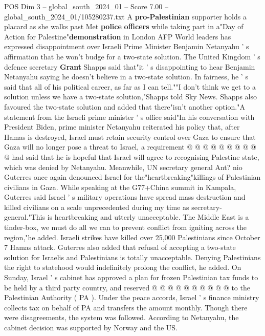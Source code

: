 \begin{textsample}{POS Dim 3 – global\_south\_2024\_01 – Score 7.00 – global\_south\_2024\_01/105280237.txt}  \label{ex:f3_pos_379}
A \textbf{pro-Palestinian} supporter holds a placard as she walks past Met \textbf{police} \textbf{officers} while taking part in a"Day of Action for Palestine"\textbf{demonstration} in London AFP World leaders has expressed disappointment over Israeli Prime Minister Benjamin Netanyahu ' s affirmation that he won't budge for a two-state solution.
The United Kingdom ' s defence secretary \textbf{Grant} Shapps said that"it ' s disappointing to hear Benjamin Netanyahu saying he doesn't believe in a two-state solution.
In fairness, he ' s said that all of his political career, as far as I can tell.""I don't think we get to a solution unless we have a two-state solution,"Shapps told Sky News.
Shapps also favoured the two-state solution and added that there"isn't another option."A statement from the Israeli prime minister ' s office said"In his conversation with President Biden, prime minister Netanyahu reiterated his policy that, after Hamas is destroyed, Israel must retain security control over Gaza to ensure that Gaza will no longer pose a threat to Israel, a requirement @ @ @ @ @ @ @ @ @ @ had said that he is hopeful that Israel will agree to recognising Palestine state, which was denied by Netanyahu.
Meanwhile, UN secretary general Ant? nio Guterres once again denounced Israel for the"heartbreaking"killings of Palestinian civilians in Gaza.
While speaking at the G77+China summit in Kampala, Guterres said Israel ' s military operations have spread mass destruction and killed civilians on a scale unprecedented during my time as secretary-general."This is heartbreaking and utterly unacceptable.
The Middle East is a tinder-box, we must do all we can to prevent conflict from igniting across the region,"he added.
Israeli strikes have killed over 25,000 Palestinians since October 7 Hamas attack.
Guterres also added that refusal of accepting a two-state solution for Israelis and Palestinians is totally unacceptable.
Denying Palestinians the right to statehood would indefinitely prolong the conflict, he added.
On Sunday, Israel ' s cabinet has approved a plan for frozen Palestinian tax funds to be held by a third party country, and reserved @ @ @ @ @ @ @ @ @ @ to the Palestinian Authority ( PA ).
Under the peace accords, Israel ' s finance ministry collects tax on behalf of PA and transfers the amount monthly.
Though there were disagreements, the system was followed.
According to Netanyahu, the cabinet decision was supported by Norway and the US.

\end{textsample}

